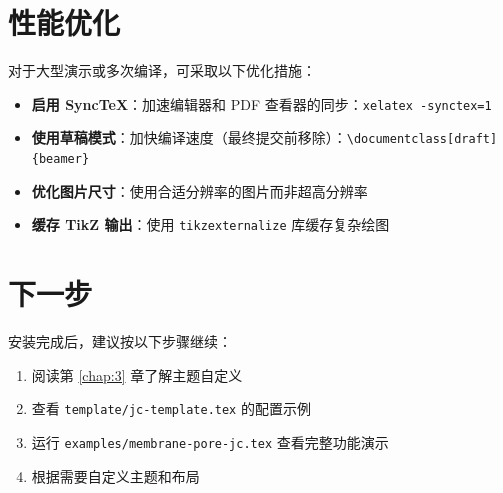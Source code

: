 \section{性能优化}

对于大型演示或多次编译，可采取以下优化措施：

\begin{itemize}
    \item \textbf{启用 SyncTeX}：加速编辑器和 PDF 查看器的同步：\lstinline|xelatex -synctex=1|
    \item \textbf{使用草稿模式}：加快编译速度（最终提交前移除）：\lstinline|\documentclass[draft]{beamer}|
    \item \textbf{优化图片尺寸}：使用合适分辨率的图片而非超高分辨率
    \item \textbf{缓存 TikZ 输出}：使用 \lstinline|tikzexternalize| 库缓存复杂绘图
\end{itemize}

\section{下一步}

安装完成后，建议按以下步骤继续：

\begin{enumerate}
    \item 阅读第 \ref{chap:3} 章了解主题自定义
    \item 查看 \lstinline|template/jc-template.tex| 的配置示例
    \item 运行 \lstinline|examples/membrane-pore-jc.tex| 查看完整功能演示
    \item 根据需要自定义主题和布局
\end{enumerate}